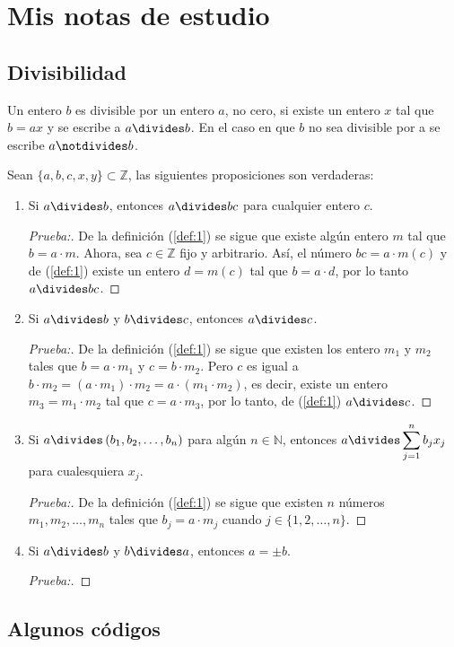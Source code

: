 \chapter*{Mis notas de estudio}
\section*{Divisibilidad}

\begin{definition}
Un entero $b$ es divisible por un entero $a$, no cero, si existe un entero $x$ tal que $b=ax$ y se escribe a $a\divides b$. En el caso en que $b$ no sea divisible por a se escribe $a\notdivides b$.
\end{definition}

\begin{theorem}
\noindent
Sean $\{a,b,c,x,y\}\subset\mathbb{Z}$, las siguientes proposiciones son verdaderas:
\begin{enumerate}[font={\bfseries},label={1)}]\label{def:1}
	\item Si $a\divides b$, entonces $a\divides bc$ para cualquier entero $c$.
	
	\begin{proof}[Prueba:]
	\noindent
	
	De la definición (\ref{def:1}) se sigue que existe algún entero $m$ tal que $b=a\cdot m$. Ahora, sea $c\in\mathbb{Z}$ fijo y arbitrario. Así, el número $bc=a\cdot m(c)$ y de (\ref{def:1}) existe un entero $d=m(c)$ tal que $b=a\cdot d$, por lo tanto $a\divides bc$.
	\end{proof}

	\item Si $a\divides b$ y $b\divides c$, entonces $a\divides c$.
	
	\begin{proof}[Prueba:]
	\noindent
	
	De la definición (\ref{def:1}) se sigue que existen los entero $m_1$ y $m_2$ tales que $b=a\cdot m_1$ y $c=b\cdot m_2$. Pero $c$ es igual a $b\cdot m_2=(a\cdot m_1)\cdot m_2=a\cdot(m_1\cdot m_2)$, es decir, existe un entero $m_3=m_1\cdot m_2$ tal que $c=a\cdot m_3$, por lo tanto, de (\ref{def:1}) $a\divides c$. 
	\end{proof}

	\item Si $a\divides \left(b_1,b_2,\ldots,b_n\right)$ para algún $n\in\mathbb{N}$, entonces $a\divides \displaystyle\sum_{j=1}^{n}b_jx_j$ para cualesquiera $x_j$.
	
	\begin{proof}[Prueba:]
	\noindent
	
	De la definición (\ref{def:1}) se sigue que existen $n$ números $m_1,m_2,\ldots, m_n$ tales que $b_j=a\cdot m_j$ cuando $j\in\{1,2,\ldots,n\}$.
	\end{proof}

	\item Si $a\divides b$ y $b\divides a$, entonces $a=\pm b$.
	
	\begin{proof}[Prueba:]
	\noindent
	
	\end{proof}
\end{enumerate}
\end{theorem}

\section*{Algunos códigos}


